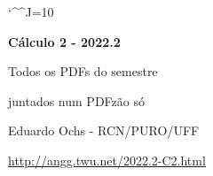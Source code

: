 \documentclass[oneside,12pt]{article}
\begin{document}

\def\u#1{\par{\footnotesize \url{#1}}}

\def\drafturl{http://angg.twu.net/LATEX/2022-2-C2.pdf}
\def\drafturl{http://angg.twu.net/2022.2-C2.html}
\def\draftfooter{\tiny \href{\drafturl}{\jobname{}} \ColorBrown{\shorttoday{} \hours}}

\catcode`\^^J=10
\pu



%

\thispagestyle{empty}

\begin{center}

\vspace*{1.2cm}

{\bf \Large Cálculo 2 - 2022.2}

\bsk

Todos os PDFs do semestre

juntados num PDFzão só

\bsk

Eduardo Ochs - RCN/PURO/UFF

\url{http://angg.twu.net/2022.2-C2.html}

\end{center}

\newpage



\end{document}
